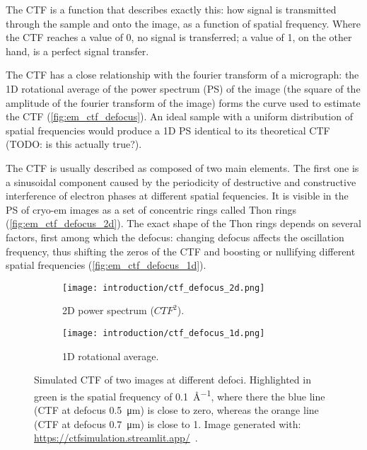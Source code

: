 The CTF is a function that describes exactly this: how signal is transmitted through the sample and onto the image, as a function of spatial frequency.
Where the CTF reaches a value of \num{0}, no signal is transferred; a value of \num{1}, on the other hand, is a perfect signal transfer.

The CTF has a close relationship with the fourier transform of a micrograph: the 1D rotational average of the power spectrum (PS) of the image (the square of the amplitude of the fourier transform of the image) forms the curve used to estimate the CTF (\autoref{fig:em_ctf_defocus}).
An ideal sample with a uniform distribution of spatial frequencies would produce a 1D PS identical to its theoretical CTF (TODO: is this actually true?).

The CTF is usually described as composed of two main elements.
The first one is a sinusoidal component caused by the periodicity of destructive and constructive interference of electron phases at different spatial fequencies.
It is visible in the PS of cryo-em images as a set of concentric rings called Thon rings (\autoref{fig:em_ctf_defocus_2d}).
The exact shape of the Thon rings depends on several factors, first among which the defocus: changing defocus affects the oscillation frequency, thus shifting the zeros of the CTF and boosting or nullifying different spatial frequencies (\autoref{fig:em_ctf_defocus_1d}).

\begin{figure}[ht]
    \centering
    \begin{subfigure}{.6\textwidth}
        \centering
        \texttt{[image: introduction/ctf\_defocus\_2d.png]}
        \caption{2D power spectrum ($CTF^2$).}
        \label{fig:em_ctf_defocus_2d}
    \end{subfigure}%

    \begin{subfigure}{\textwidth}
        \centering
        \texttt{[image: introduction/ctf\_defocus\_1d.png]}
        \caption{1D rotational average.}
        \label{fig:em_ctf_defocus_1d}
    \end{subfigure}%

    \caption[CTF: effect of defocus]{Simulated CTF of two images at different defoci. Highlighted in green is the spatial frequency of \qty{0.1}{\angstrom^{-1}}, where there the blue line (CTF at defocus \qty{0.5}{\micro\meter}) is close to zero, whereas the orange line (CTF at defocus \qty{0.7}{\micro\meter}) is close to 1. Image generated with: \url{https://ctfsimulation.streamlit.app/}~\cite{jiangWebbasedSimulationContrast2001}.}
    \label{fig:em_ctf_defocus}
\end{figure}

